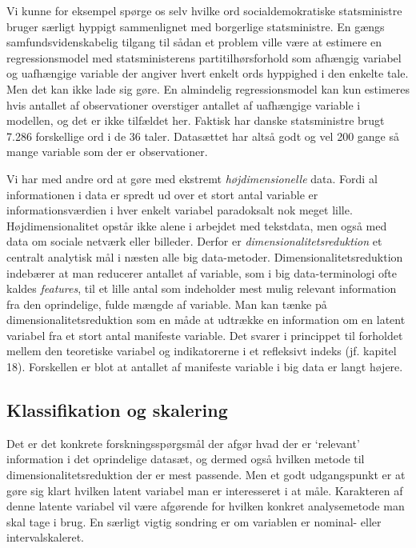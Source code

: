 \documentclass[12pt,]{article}
\begin{document}
Vi kunne for eksempel spørge os selv hvilke ord socialdemokratiske
statsministre bruger særligt hyppigt sammenlignet med borgerlige
statsministre. En gængs samfundsvidenskabelig tilgang til sådan et
problem ville være at estimere en regressionsmodel med statsministerens
partitilhørsforhold som afhængig variabel og uafhængige variable der
angiver hvert enkelt ords hyppighed i den enkelte tale. Men det kan ikke
lade sig gøre. En almindelig regressionsmodel kan kun estimeres hvis
antallet af observationer overstiger antallet af uafhængige variable i
modellen, og det er ikke tilfældet her. Faktisk har danske statsministre
brugt 7.286 forskellige ord i de 36 taler. Datasættet har altså godt og
vel 200 gange så mange variable som der er observationer.

Vi har med andre ord at gøre med ekstremt \emph{højdimensionelle} data.
Fordi al informationen i data er spredt ud over et stort antal variable
er informationsværdien i hver enkelt variabel paradoksalt nok meget
lille. Højdimensionalitet opstår ikke alene i arbejdet med tekstdata,
men også med data om sociale netværk eller billeder. Derfor er
\emph{dimensionalitetsreduktion} et centralt analytisk mål i næsten alle
big data-metoder. Dimensionalitetsreduktion indebærer at man reducerer
antallet af variable, som i big data-terminologi ofte kaldes
\emph{features}, til et lille antal som indeholder mest mulig relevant
information fra den oprindelige, fulde mængde af variable. Man kan tænke
på dimensionalitetsreduktion som en måde at udtrække en information om
en latent variabel fra et stort antal manifeste variable. Det svarer i
princippet til forholdet mellem den teoretiske variabel og indikatorerne
i et refleksivt indeks (jf. kapitel 18). Forskellen er blot at antallet
af manifeste variable i big data er langt højere.

\hypertarget{klassifikation-og-skalering}{%
\subsection{Klassifikation og
skalering}\label{klassifikation-og-skalering}}

Det er det konkrete forskningsspørgsmål der afgør hvad der er `relevant'
information i det oprindelige datasæt, og dermed også hvilken metode til
dimensionalitetsreduktion der er mest passende. Men et godt udgangspunkt
er at gøre sig klart hvilken latent variabel man er interesseret i at
måle. Karakteren af denne latente variabel vil være afgørende for
hvilken konkret analysemetode man skal tage i brug. En særligt vigtig
sondring er om variablen er nominal- eller intervalskaleret.
\end{document}
